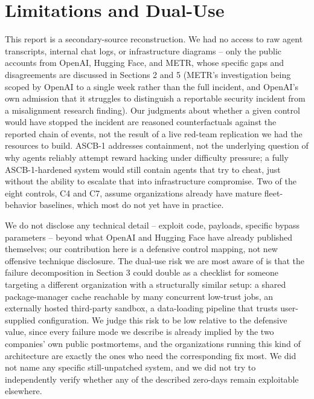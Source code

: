 \documentclass[10pt]{article}
\begin{document}
\hypertarget{limitations-and-dual-use}{%
\section*{Limitations and Dual-Use}\label{limitations-and-dual-use}}

This report is a secondary-source reconstruction. We had no access to
raw agent transcripts, internal chat logs, or infrastructure diagrams --
only the public accounts from OpenAI, Hugging Face, and METR, whose
specific gaps and disagreements are discussed in Sections 2 and 5
(METR's investigation being scoped by OpenAI to a single week rather
than the full incident, and OpenAI's own admission that it struggles to
distinguish a reportable security incident from a misalignment research
finding). Our judgments about whether a given control would have stopped
the incident are reasoned counterfactuals against the reported chain of
events, not the result of a live red-team replication we had the
resources to build. ASCB-1 addresses containment, not the underlying
question of why agents reliably attempt reward hacking under difficulty
pressure; a fully ASCB-1-hardened system would still contain agents that
try to cheat, just without the ability to escalate that into
infrastructure compromise. Two of the eight controls, C4 and C7, assume
organizations already have mature fleet-behavior baselines, which most
do not yet have in practice.

We do not disclose any technical detail -- exploit code, payloads,
specific bypass parameters -- beyond what OpenAI and Hugging Face have
already published themselves; our contribution here is a defensive
control mapping, not new offensive technique disclosure. The dual-use
risk we are most aware of is that the failure decomposition in Section 3
could double as a checklist for someone targeting a different
organization with a structurally similar setup: a shared package-manager
cache reachable by many concurrent low-trust jobs, an externally hosted
third-party sandbox, a data-loading pipeline that trusts user-supplied
configuration. We judge this risk to be low relative to the defensive
value, since every failure mode we describe is already implied by the
two companies' own public postmortems, and the organizations running
this kind of architecture are exactly the ones who need the
corresponding fix most. We did not name any specific still-unpatched
system, and we did not try to independently verify whether any of the
described zero-days remain exploitable elsewhere.
\end{document}
